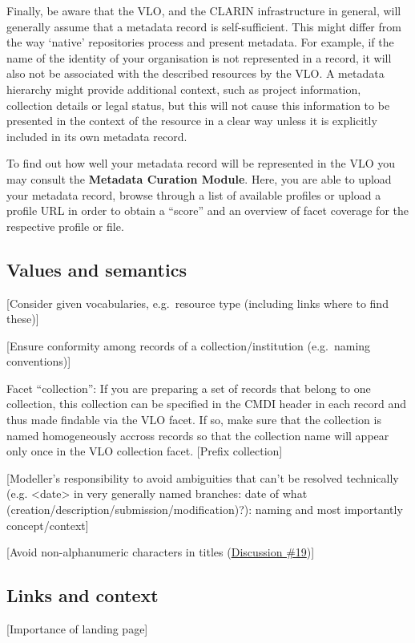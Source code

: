 Finally, be aware that the VLO, and the CLARIN infrastructure in
general, will generally assume that a metadata record is
self-sufficient. This might differ from the way `native' repositories
process and present metadata. For example, if the name of the identity
of your organisation is not represented in a record, it will also not be
associated with the described resources by the VLO. A metadata hierarchy
might provide additional context, such as project information,
collection details or legal status, but this will not cause this
information to be presented in the context of the resource in a clear
way unless it is explicitly included in its own metadata record.

To find out how well your metadata record will be represented in the VLO
you may consult the \textbf{Metadata Curation Module}. Here, you are
able to upload your metadata record, browse through a list of available
profiles or upload a profile URL in order to obtain a ``score'' and an
overview of facet coverage for the respective profile or file.

\subsection{Values and semantics}\label{values-and-semantics}

{[}Consider given vocabularies, e.g.~resource type (including links
where to find these){]}

{[}Ensure conformity among records of a collection/institution
(e.g.~naming conventions){]}

Facet ``collection'': If you are preparing a set of records that belong
to one collection, this collection can be specified in the CMDI header
in each record and thus made findable via the VLO facet. If so, make
sure that the collection is named homogeneously accross records so that
the collection name will appear only once in the VLO collection facet.
{[}Prefix collection{]}

{[}Modeller's responsibility to avoid ambiguities that can't be resolved
technically (e.g. \textless{}date\textgreater{} in very generally named
branches: date of what (creation/description/submission/modification)?):
naming and most importantly concept/context{]}

{[}Avoid non-alphanumeric characters in titles
(\href{https://www.gitbook.com/book/cmdi-taskforce/cmdi-best-practices/discussions/19}{Discussion
\#19}){]}

\subsection{Links and context}\label{links-and-context}

{[}Importance of landing page{]}
